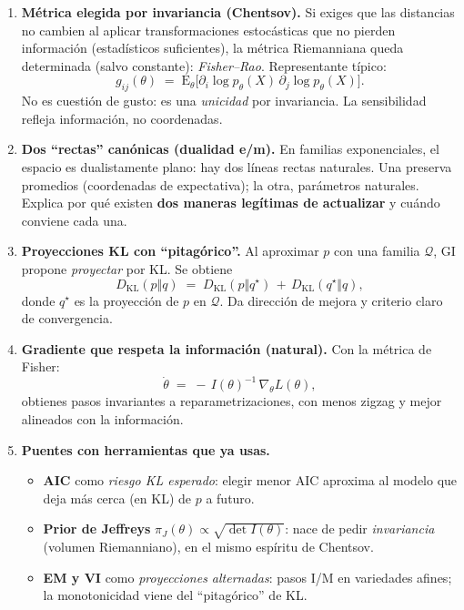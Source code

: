 \begin{enumerate}
	\item \textbf{Métrica elegida por invariancia (Chentsov).} Si exiges que las distancias no cambien al aplicar transformaciones estocásticas que no pierden información (estadísticos suficientes), la métrica Riemanniana queda determinada (salvo constante): \emph{Fisher--Rao}. Representante típico:
	\[
	g_{ij}(\theta)\;=\;\mathrm{E}_{\theta}\!\big[\partial_i \log p_\theta(X)\,\partial_j \log p_\theta(X)\big].
	\]
	No es cuestión de gusto: es una \emph{unicidad} por invariancia. La sensibilidad refleja información, no coordenadas.
	
	\item \textbf{Dos “rectas” canónicas (dualidad e/m).} En familias exponenciales, el espacio es dualistamente plano: hay dos líneas rectas naturales. Una preserva promedios (coordenadas de expectativa); la otra, parámetros naturales. Explica por qué existen \textbf{dos maneras legítimas de actualizar} y cuándo conviene cada una.
	
	\item \textbf{Proyecciones KL con “pitagórico”.} Al aproximar $p$ con una familia $\mathcal{Q}$, GI propone \emph{proyectar} por KL. Se obtiene
	\[
	D_{\mathrm{KL}}(p\Vert q)\;=\;D_{\mathrm{KL}}(p\Vert q^\star)\,+\,D_{\mathrm{KL}}(q^\star\Vert q),
	\]
	donde $q^\star$ es la proyección de $p$ en $\mathcal{Q}$. Da dirección de mejora y criterio claro de convergencia.
	
	\item \textbf{Gradiente que respeta la información (natural).} Con la métrica de Fisher:
	\[
	\dot{\theta}\;=\;-\,I(\theta)^{-1}\,\nabla_{\!\theta} L(\theta),
	\]
	obtienes pasos invariantes a reparametrizaciones, con menos zigzag y mejor alineados con la información.
	
	\item \textbf{Puentes con herramientas que ya usas.}
	\begin{itemize}
		\item \textbf{AIC} como \emph{riesgo KL esperado}: elegir menor AIC aproxima al modelo que deja más cerca (en KL) de $p$ a futuro.
		\item \textbf{Prior de Jeffreys} $\pi_J(\theta)\propto \sqrt{\det I(\theta)}$: nace de pedir \emph{invariancia} (volumen Riemanniano), en el mismo espíritu de Chentsov.
		\item \textbf{EM y VI} como \emph{proyecciones alternadas}: pasos I/M en variedades afines; la monotonicidad viene del “pitagórico” de KL.
	\end{itemize}
\end{enumerate}

